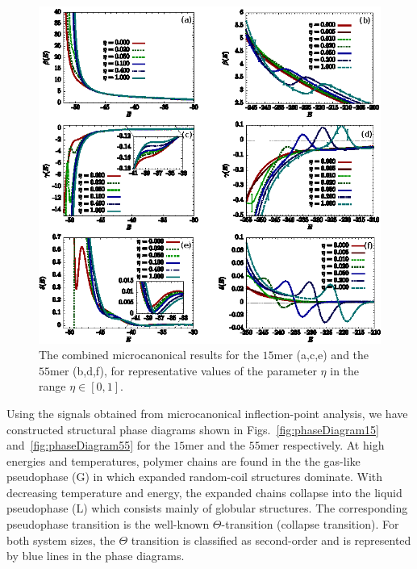 \documentclass[12pt]{report}
\begin{document}
%
\begin{figure}
\center
    \includegraphics[width=1.0\textwidth]{chapter6Figs/microcanonicalAnalysis.eps}%
    \caption{\label{fig:microcanonicalAnalysis}
	The combined microcanonical results for the $15$mer (a,c,e) and the $55$mer (b,d,f), for representative values of the parameter $\eta$ in the range $\eta\in[0,1]$.}
\end{figure}
%

\newpage
Using the signals obtained from microcanonical inflection-point analysis, we have constructed structural phase diagrams shown in Figs.~\ref{fig:phaseDiagram15} and~\ref{fig:phaseDiagram55} for the $15$mer and the $55$mer respectively. At high energies and temperatures, polymer chains are found in the the gas-like pseudophase (G) in which expanded random-coil structures dominate. With decreasing temperature and energy, the expanded chains collapse into the liquid pseudophase (L) which consists mainly of globular structures. The corresponding pseudophase transition is the well-known $\Theta$-transition (collapse transition). For both system sizes, the $\Theta$ transition is classified as second-order and is represented by blue lines in the phase diagrams.
\end{document}
